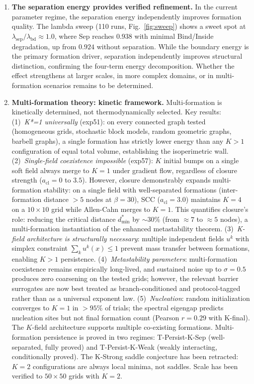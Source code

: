 \documentclass[lettersize,journal]{IEEEtran}
\begin{document}
\begin{enumerate}
\item \textbf{The separation energy provides verified refinement.} In the current parameter regime, the separation energy independently improves formation quality. The lambda sweep (110 runs, Fig.~\ref{fig:sweep}) shows a sweet spot at $\lambda_{\mathrm{sep}}/\lambda_{\mathrm{bd}} \approx 1.0$, where Sep reaches $0.938$ with minimal Bind/Inside degradation, up from $0.924$ without separation. While the boundary energy is the primary formation driver, separation independently improves structural distinction, confirming the four-term energy decomposition. Whether the effect strengthens at larger scales, in more complex domains, or in multi-formation scenarios remains to be determined.

\item \textbf{Multi-formation theory: kinetic framework.} Multi-formation is kinetically determined, not thermodynamically selected. Key results: (1)~\emph{K*=1 universally} (exp51): on every connected graph tested (homogeneous grids, stochastic block models, random geometric graphs, barbell graphs), a single formation has strictly lower energy than any $K > 1$ configuration of equal total volume, establishing the isoperimetric wall. (2)~\emph{Single-field coexistence impossible} (exp57): $K$ initial bumps on a single soft field always merge to $K=1$ under gradient flow, regardless of closure strength ($a_{\mathrm{cl}} = 0$ to $3.5$). However, closure demonstrably expands multi-formation stability: on a single field with well-separated formations (inter-formation distance $> 5$ nodes at $\beta=30$), SCC ($a_{\mathrm{cl}}=3.0$) maintains $K=4$ on a $10 \times 10$ grid while Allen-Cahn merges to $K=1$. This quantifies closure's role: reducing the critical distance $d_{\min}^*$ by $\sim 30\%$ (from $\approx 7$ to $\approx 5$ nodes), a multi-formation instantiation of the enhanced metastability theorem. (3)~\emph{K-field architecture is structurally necessary}: multiple independent fields $u^k$ with simplex constraint $\sum_k u^k(x) \leq 1$ prevent mass transfer between formations, enabling $K > 1$ persistence. (4)~\emph{Metastability parameters}: multi-formation coexistence remains empirically long-lived, and sustained noise up to $\sigma = 0.5$ produces zero coarsening on the tested grids; however, the relevant barrier surrogates are now best treated as branch-conditioned and protocol-tagged rather than as a universal exponent law. (5)~\emph{Nucleation}: random initialization converges to $K=1$ in $>95\%$ of trials; the spectral eigengap predicts nucleation sites but not final formation count (Pearson $r = 0.29$ with K-final). The $K$-field architecture supports multiple co-existing formations. Multi-formation persistence is proved in two regimes: T-Persist-K-Sep (well-separated, fully proved) and T-Persist-K-Weak (weakly interacting, conditionally proved). The K-Strong saddle conjecture has been retracted: $K = 2$ configurations are always local minima, not saddles. Scale has been verified to $50 \times 50$ grids with $K = 2$.
\end{enumerate}
\end{document}

